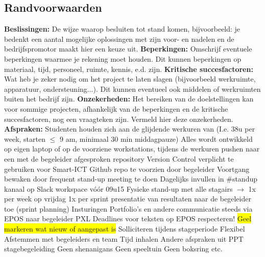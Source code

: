 \documentclass[a4paper]{article}
\begin{document}
    \subsection{Randvoorwaarden}
      \begin{outline}
        \1 \textbf{Beslissingen:}
          \2[] De wijze waarop besluiten tot stand komen, bijvoorbeeld: je bedenkt een aantal
          mogelijke oplossingen met zijn voor- en nadelen en de bedrijfspromotor maakt hier een keuze uit.
        \1 \textbf{Beperkingen:}
          \2[] Omschrijf eventuele beperkingen waarmee je rekening moet houden. Dit kunnen
          beperkingen op materiaal, tijd, personeel, ruimte, kennis, e.d. zijn.
        \1 \textbf{Kritische succesfactoren:}
          \2[] Wat heb je zeker nodig om het project te laten slagen (bijvoorbeeld werkruimte, apparatuur,
          ondersteuning...). Dit kunnen eventueel ook middelen of werkruimten buiten het bedrijf zijn.
        \1 \textbf{Onzekerheden:}
          \2[] Het bereiken van de doelstellingen kan voor sommige projecten, afhankelijk van de beperkingen
          en de kritische succesfactoren, nog een vraagteken zijn. Vermeld hier deze onzekerheden.
        \1 \textbf{Afspraken:}
          \2 Studenten houden zich aan de glijdende werkuren van \stagebedrijf (I.e. 38u per week, starten $\leq$
          9 am, minimaal 30 min middagpauze)
          \2 Alles wordt ontwikkeld op eigen laptop of op de voorziene workstations, tijdens de werkuren pushen
          naar een met de begeleider afgesproken repository
            \3 Version Control verplicht te gebruiken voor Smart-ICT
            \3 Github repo te voorzien door begeleider
          \2 Voortgang bewaken door frequent stand-up meeting te doen
            \3 Dagelijks invullen in $\#$standup kanaal op Slack workspace vóór 09u15
            \3 Fysieke stand-up met alle stagairs $\rightarrow$ 1x per week op vrijdag
          \2 1x per sprint presentatie van resultaten naar de begeleider toe (sprint planning)
          \2 Insturingen
            \3 Portfolio’s en andere communicatie steeds via EPOS naar begeleider PXL 
            \3 Deadlines voor teksten op EPOS respecteren! 
            \3 \colorbox{yellow}{Geel markeren wat nieuw of aangepast is}
          \2 Solliciteren tijdens stageperiode
            \3 Flexibel
            \3 Afstemmen met begeleiders en team
            \3 Tijd inhalen
            \3 Andere afspraken uit PPT stagebegeleiding
          \2 Geen shenanigans
            \3 Geen speeltuin
            \3 Geen boksring
            \3 etc.
      \end{outline}
\end{document}
